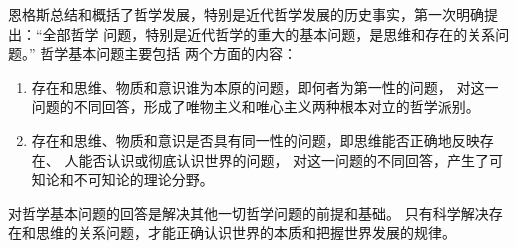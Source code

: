\documentclass[utf-8, 10pt]{article}
\begin{document}
恩格斯总结和概括了哲学发展，特别是近代哲学发展的历史事实，第一次明确提出：“全部哲学
问题，特别是近代哲学的重大的基本问题，是思维和存在的关系问题。” 哲学基本问题主要包括
两个方面的内容：
\begin{enumerate}[label={$\left.\arabic*\right)$}, itemsep=0pt]
    \item 存在和思维、物质和意识谁为本原的问题，即何者为第一性的问题，
    对这一问题的不同回答，形成了唯物主义和唯心主义两种根本对立的哲学派别。
    \item 存在和思维、物质和意识是否具有同一性的问题，即思维能否正确地反映存在、
    人能否认识或彻底认识世界的问题，
    对这一问题的不同回答，产生了可知论和不可知论的理论分野。
\end{enumerate}
对哲学基本问题的回答是解决其他一切哲学问题的前提和基础。
只有科学解决存在和思维的关系问题，才能正确认识世界的本质和把握世界发展的规律。
\end{document}
